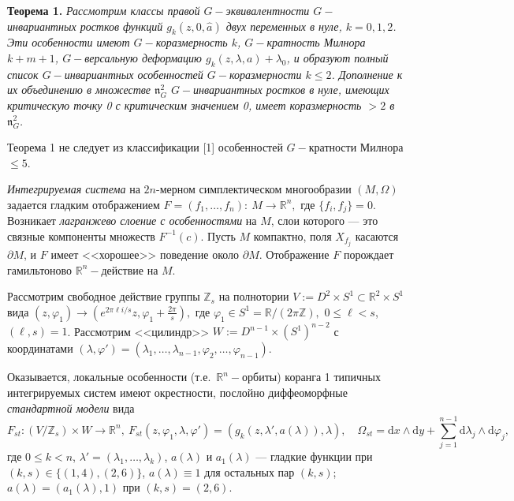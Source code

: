 \documentclass[a4paper, 12pt, oneside]{ncc}
\begin{document}
\smallskip
\textbf{Теорема 1. } {\sl
Рассмотрим классы {\em правой} $G-$эквивалентности $G-$инва\-ри\-ант\-ных ростков функций $g_k(z,0,\hat a)$ двух переменных в нуле, $k=0,1,2$.
Эти особенности имеют $G-$кораз\-мер\-ность $k$, $G-$кратность Милнора $k+m+1$, $G-$версальную деформацию $g_k(z,\lambda,a)+\lambda_0$, и образуют полный список $G-$инва\-ри\-ант\-ных особенностей $G-$ко\-раз\-мер\-ности $k\le 2$. Дополнение к их объединению в множестве $\mathfrak{n}^2_G
$
$G-$инва\-ри\-ант\-ных ростков в нуле, имеющих критическую точку 0 с критическим значением 0, имеет коразмерность $>2$ в $\mathfrak{n}_G^2$.}

\smallskip
Теорема 1 не следует из классификации [1] особенностей $G-$кратности Милнора $\le 5$. 

{\em Интегрируемая система} на $2n$-мерном симплектическом многообразии $(M,\Omega)$ задается гладким отображением $F=(f_1,\dots,f_n):\ M \longrightarrow{\mathbb R}^n,$ где $\{f_i,f_j\}=0$. Возникает {\em лагранжево слоение с особенностями} на $M$, слои которого --- это связные компоненты множеств $F^{-1}(c)$. Пусть $M$ компактно, поля $X_{f_j}$ касаются $\partial M$, и $F$ имеет <<хорошее>> поведение около $\partial M$. Отображение $F$ порождает гамильтоново $\mathbb{R}^n-$действие на $M$.

Рассмотрим свободное действие группы $\mathbb{Z}_s$ на полнотории $V:=D^2\times S^1\subset\mathbb{R}^2\times S^1$ вида 
$(z,\varphi_1)\longrightarrow (e^{2\pi \ell i/{s}}z,\varphi_1+\frac{2\pi}{s}),$ 
где $\varphi_1\in S^1=\mathbb R/(2\pi\mathbb Z),
$
$0\le\ell<s$, $(\ell,s)=1$. Рассмотрим <<цилиндр>> $W:=D^{n-1}\times(S^1)^{n-2}$ с координатами $(\lambda,\varphi')=(\lambda_1,\dots,\lambda_{n-1},\varphi_2,\dots,\varphi_{n-1})$.

Оказывается, локальные особенности (т.е.\ $\mathbb{R}^n-$орбиты) коранга 1 типичных интегрируемых систем имеют окрестности, послойно диффеоморфные {\em стандартной модели} вида
$$
F_{st}:(V/\mathbb{Z}_s)\times W \to \mathbb R^n, \
F_{st}(z,\varphi_1,\lambda,\varphi')=(g_k(z,\lambda',a(\lambda)),\lambda), \quad
\Omega_{st} = \mathrm dx\wedge\mathrm dy + \sum\limits_{j=1}^{n-1}\mathrm d\lambda_j\wedge\mathrm  d\varphi_j,
$$
где $0\le k<n$, $\lambda'=(\lambda_1,\dots,\lambda_k)$,
$a(\lambda)$ и $a_1(\lambda)$ --- гладкие функции при $(k,s)\in\{(1,4),(2,6)\}$,
$a(\lambda)\equiv1$ для остальных пар $(k,s)$; 
$a(\lambda)=(a_1(\lambda),1)$ при $(k,s)=(2,6)$.
\end{document}

